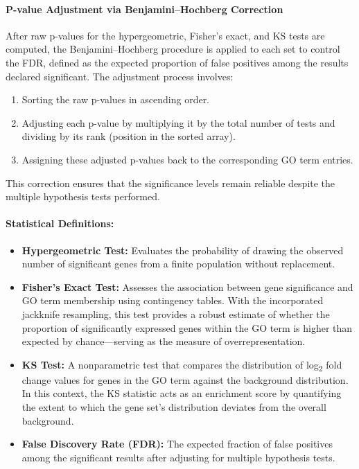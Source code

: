 \documentclass{article}
\begin{document}
    \paragraph{P-value Adjustment via Benjamini–Hochberg Correction}
    After raw p-values for the hypergeometric, Fisher's exact, and KS tests are computed, the Benjamini–Hochberg procedure is applied to each set to control the FDR, defined as the expected proportion of false positives among the results declared significant. The adjustment process involves:
    \begin{enumerate}
        \item Sorting the raw p-values in ascending order.
        \item Adjusting each p-value by multiplying it by the total number of tests and dividing by its rank (position in the sorted array).
        \item Assigning these adjusted p-values back to the corresponding GO term entries.
    \end{enumerate}
    This correction ensures that the significance levels remain reliable despite the multiple hypothesis tests performed.

    \paragraph{Statistical Definitions:}
    \begin{itemize}
        \item \textbf{Hypergeometric Test:} Evaluates the probability of drawing the observed number of significant genes from a finite population without replacement.
        \item \textbf{Fisher's Exact Test:} Assesses the association between gene significance and GO term membership using contingency tables. With the incorporated jackknife resampling, this test provides a robust estimate of whether the proportion of significantly expressed genes within the GO term is higher than expected by chance—serving as the measure of overrepresentation\cite{csaba_2019}.
        \item \textbf{KS Test:} A nonparametric test that compares the distribution of log\textsubscript{2} fold change values for genes in the GO term against the background distribution. In this context, the KS statistic acts as an enrichment score by quantifying the extent to which the gene set's distribution deviates from the overall background\cite{subramanian}.
        \item \textbf{False Discovery Rate (FDR):} The expected fraction of false positives among the significant results after adjusting for multiple hypothesis tests.
    \end{itemize}
\end{document}
